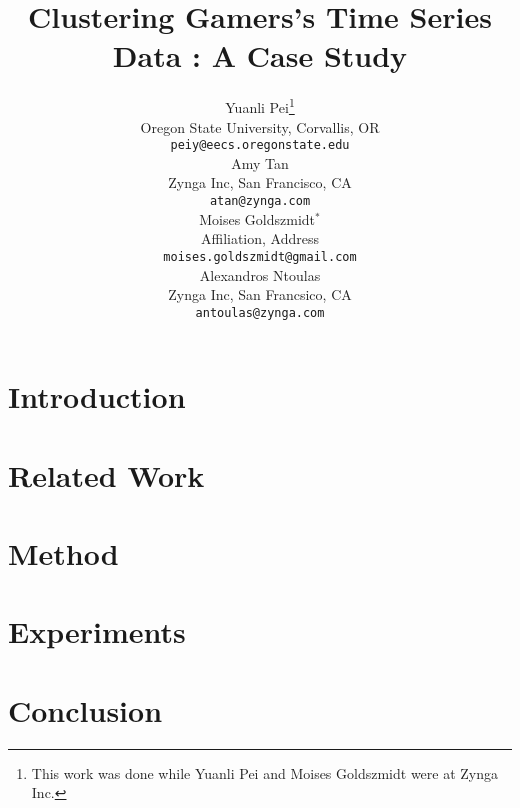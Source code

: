 \documentclass{article} %
\title{Clustering Gamers's Time Series Data : A Case Study}
\author{
Yuanli Pei\thanks{This work was done while Yuanli Pei and Moises Goldszmidt were at Zynga Inc.} \\
Oregon State University, Corvallis, OR\\
\texttt{peiy@eecs.oregonstate.edu} \\
\And
Amy Tan\\
Zynga Inc, San Francisco, CA\\
\texttt{atan@zynga.com} \\
\AND
Moises Goldszmidt$^\ast$ \\
Affiliation, Address \\
\texttt{moises.goldszmidt@gmail.com} \\
\And
Alexandros Ntoulas\\
Zynga Inc, San Francsico, CA \\
\texttt{antoulas@zynga.com} 
}
\begin{document}
\maketitle

\begin{abstract}

\end{abstract}


\section{Introduction}


\section{Related Work}


\section{Method}


\section{Experiments}


\section{Conclusion}




\small{
    {}
    
}



\end{document}
